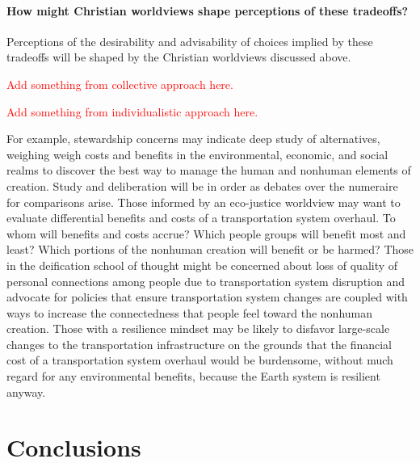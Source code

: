 \documentclass[12pt]{article}
\newcommand{\ins}[1]{\textcolor{red}{#1}}
\begin{document}
\paragraph{How might Christian worldviews shape perceptions of these tradeoffs?} 

Perceptions of the desirability and advisability of choices implied by these tradeoffs 
will be shaped by the Christian worldviews discussed above.

\ins{Add something from collective approach here.}

\ins{Add something from individualistic approach here.}

For example, stewardship concerns may indicate deep study of alternatives, 
weighing weigh costs and benefits in the environmental, economic, and social realms
to discover the best way to manage the human and nonhuman elements of creation.
Study and deliberation will be in order as debates over the numeraire for comparisons arise.
Those informed by an eco-justice worldview may want to evaluate 
differential benefits and costs of a transportation system overhaul.
To whom will benefits and costs accrue? 
Which people groups will benefit most and least? 
Which portions of the nonhuman creation will benefit or be harmed? 
Those in the deification school of thought might be concerned 
about loss of quality of personal connections 
among people due to transportation system disruption
and advocate for policies that ensure transportation system changes 
are coupled with ways to increase the connectedness that people
feel toward the nonhuman creation.
Those with a resilience mindset may be likely to disfavor 
large-scale changes to the transportation infrastructure 
on the grounds that the financial cost of a transportation system overhaul would be burdensome,
without much regard for any environmental benefits, 
because the Earth system is resilient anyway.







\section{Conclusions}
\label{sec:conclusions}
\end{document}
